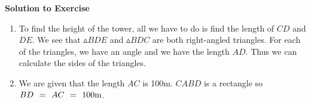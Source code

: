 {\begin{mdframed}[linewidth=4, leftmargin=40, rightmargin=40]
\begin{exercise}
\begin{figure}[H]
\begin{center}
      \vspace{2pt}
    \vspace{.1in}
    \end{center}
 \end{figure}       
        \par 
        \vspace{5pt}
        \label{m39411*solfhsst!!!underscore!!!id1394}\noindent\textbf{Solution to Exercise } \label{m39411*listfhsst!!!underscore!!!id1394}\begin{enumerate}[noitemsep, label=\textbf{Step} \textbf{\arabic*}. ] 
            \leftskip=20pt\rightskip=\leftskip\item  
        \label{m39411*id81976}To find the height of the tower, all we have to do is find the length of \begin{math}CD\end{math} and \begin{math}DE\end{math}. We see that \begin{math}▵BDE\end{math} and \begin{math}▵BDC\end{math} are both right-angled triangles. For each of the triangles, we have an angle and we have the length \begin{math}AD\end{math}. Thus we can calculate the sides of the triangles.\par 
        \item  
        \label{m39411*id82067}We are given that the length \begin{math}AC\end{math} is 100m. \begin{math}CABD\end{math} is a rectangle so \begin{math}BD\phantom{\rule{4pt}{0ex}}=\phantom{\rule{4pt}{0ex}}AC\phantom{\rule{4pt}{0ex}}=\phantom{\rule{4pt}{0ex}}100\mathrm{m}\end{math}.\par 
        \label{m39411*id82138}\nopagebreak\noindent{}
\end{enumerate}
\end{exercise}
\end{mdframed}}
